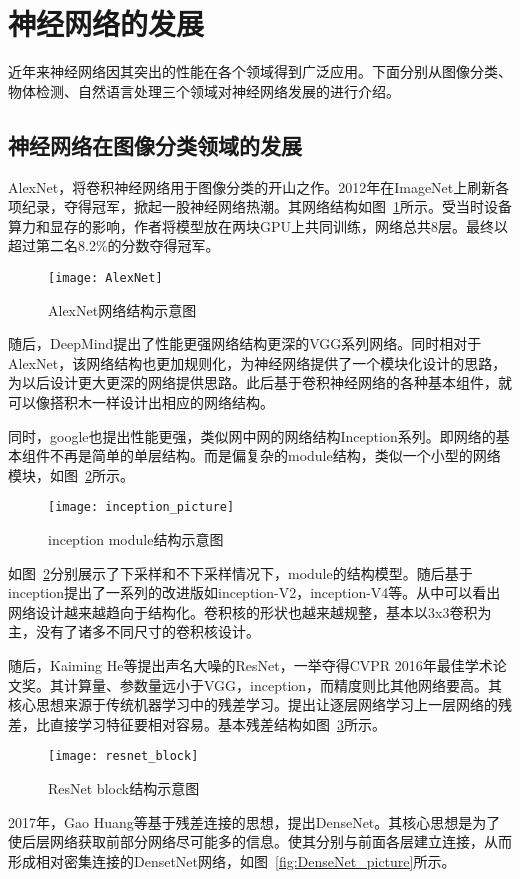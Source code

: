 \section{神经网络的发展}
近年来神经网络因其突出的性能在各个领域得到广泛应用。下面分别从图像分类、物体检测、自然语言处理三个领域对神经网络发展的进行介绍。
\subsection{神经网络在图像分类领域的发展}
AlexNet，将卷积神经网络用于图像分类的开山之作。2012年在ImageNet上刷新各项纪录，夺得冠军，掀起一股神经网络热潮。其网络结构如图~\ref{fig:AlexNet}所示。受当时设备算力和显存的影响，作者将模型放在两块GPU上共同训练，网络总共8层。最终以超过第二名8.2\%的分数夺得冠军。

\begin{figure}[htp]
\centering
\texttt{[image: AlexNet]}
\caption{AlexNet网络结构示意图}
\label{fig:AlexNet}
\end{figure}
随后，DeepMind提出了性能更强网络结构更深的VGG系列网络。同时相对于AlexNet，该网络结构也更加规则化，为神经网络提供了一个模块化设计的思路，为以后设计更大更深的网络提供思路。此后基于卷积神经网络的各种基本组件，就可以像搭积木一样设计出相应的网络结构。

同时，google也提出性能更强，类似网中网的网络结构Inception系列。即网络的基本组件不再是简单的单层结构。而是偏复杂的module结构，类似一个小型的网络模块，如图~\ref{fig:inception_picture}所示。

\begin{figure}[htp]
\centering
\texttt{[image: inception\_picture]}
\caption{inception module结构示意图}
\label{fig:inception_picture}
\end{figure}
如图~\ref{fig:inception_picture}分别展示了下采样和不下采样情况下，module的结构模型。随后基于inception提出了一系列的改进版如inception-V2，inception-V4等。从中可以看出网络设计越来越趋向于结构化。卷积核的形状也越来越规整，基本以3x3卷积为主，没有了诸多不同尺寸的卷积核设计。

随后，Kaiming He等提出声名大噪的ResNet，一举夺得CVPR 2016年最佳学术论文奖。其计算量、参数量远小于VGG，inception，而精度则比其他网络要高。其核心思想来源于传统机器学习中的残差学习。提出让逐层网络学习上一层网络的残差，比直接学习特征要相对容易。基本残差结构如图~\ref{fig:resnet_block}所示。

\begin{figure}[htp]
\centering
\texttt{[image: resnet\_block]}
\caption{ResNet block结构示意图}
\label{fig:resnet_block}
\end{figure}
2017年，Gao Huang等基于残差连接的思想，提出DenseNet。其核心思想是为了使后层网络获取前部分网络尽可能多的信息。使其分别与前面各层建立连接，从而形成相对密集连接的DensetNet网络，如图~\ref{fig:DenseNet_picture}所示。


